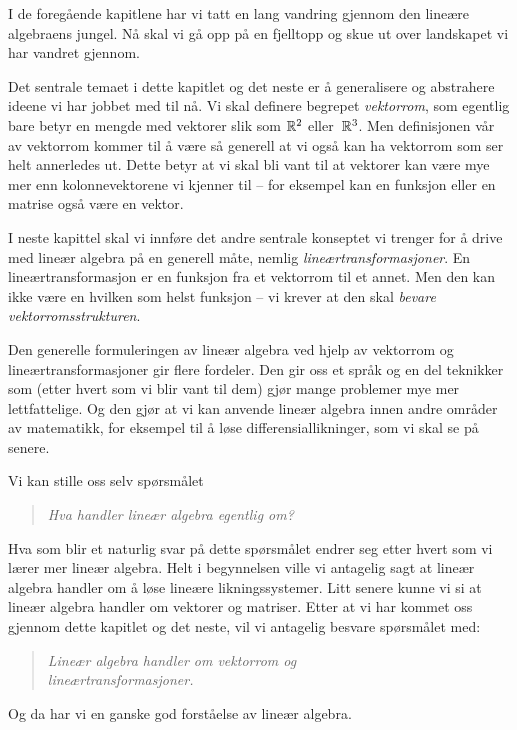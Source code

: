 

\label{ch:vektorrom}

I de foregående kapitlene har vi tatt en lang vandring gjennom den
lineære algebraens jungel.  Nå skal vi gå opp på en fjelltopp og skue
ut over landskapet vi har vandret gjennom.

Det sentrale temaet i dette kapitlet og det neste er å generalisere og
abstrahere ideene vi har jobbet med til nå.  Vi skal definere begrepet
\emph{vektorrom}, som egentlig bare betyr en mengde med vektorer slik
som $\mathbb{R}^2$ eller~$\mathbb{R}^3$.  Men definisjonen vår av vektorrom kommer til
å være så generell at vi også kan ha vektorrom som ser helt annerledes
ut.  Dette betyr at vi skal bli vant til at vektorer kan være mye mer
enn kolonnevektorene vi kjenner til -- for eksempel kan en funksjon
eller en matrise også være en vektor.

I neste kapittel skal vi innføre det andre sentrale konseptet vi
trenger for å drive med lineær algebra på en generell måte, nemlig
\emph{lineærtransformasjoner}.  En lineærtransformasjon er en funksjon
fra et vektorrom til et annet.  Men den kan ikke være en hvilken som
helst funksjon -- vi krever at den skal \emph{bevare
  vektorromsstrukturen}.

Den generelle formuleringen av lineær algebra ved hjelp av vektorrom
og lineærtransformasjoner gir flere fordeler.  Den gir oss et språk og
en del teknikker som (etter hvert som vi blir vant til dem) gjør mange
problemer mye mer lettfattelige.  Og den gjør at vi kan anvende lineær
algebra innen andre områder av matematikk, for eksempel til å løse
differensiallikninger, som vi skal se på senere.



Vi kan stille oss selv spørsmålet
\begin{quote}
\emph{Hva handler lineær algebra egentlig om?}
\end{quote}
Hva som blir et naturlig svar på dette spørsmålet endrer seg etter
hvert som vi lærer mer lineær algebra.  Helt i begynnelsen ville vi
antagelig sagt at lineær algebra handler om å løse lineære
likningssystemer.  Litt senere kunne vi si at lineær algebra handler
om vektorer og matriser.  Etter at vi har kommet oss gjennom dette
kapitlet og det neste, vil vi antagelig besvare spørsmålet med:
\begin{quote}
\emph{Lineær algebra handler om vektorrom og\\lineærtransformasjoner.}
\end{quote}
Og da har vi en ganske god forståelse av lineær algebra.


